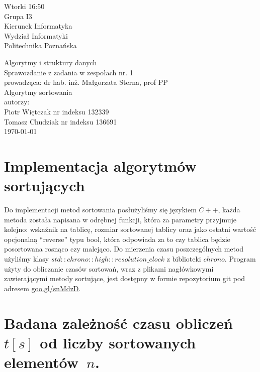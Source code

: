 \documentclass[polish,polish,a4paper]{article}
\begin{document}
	
\begin{spacing}{1.5}
		\begin{titlepage}
			\begin{flushright}
				{ Wtorki 16:50\\
					Grupa I3\\
					Kierunek Informatyka\\
					Wydział Informatyki\\
					Politechnika Poznańska}
			\end{flushright}
		\vspace*{\fill}
		\begin{center}
			{\Large Algorytmy i struktury danych \\[0.1cm]
				Sprawozdanie z zadania w zespołach nr. 1\\[0.1cm]
				prowadząca: dr hab. inż. Małgorzata Sterna, prof PP}\\
			{\Huge Algorytmy sortowania\\ [0.4cm]}
			{\large autorzy:\\[0.1cm]}
			{\large Piotr Więtczak nr indeksu 132339\\[0.1cm] Tomasz Chudziak nr indeksu 136691}\\[0.5cm]
			\today
		\end{center}
		\vspace*{\fill}
	\end{titlepage}
	
	\section{Implementacja algorytmów sortujących}
	Do implementacji metod sortowania posłużyliśmy się językiem $ C++ $, każda metoda została napisana  w odrębnej  funkcji, która za parametry przyjmuje kolejno: wskaźnik na tablicę, rozmiar sortowanej tablicy oraz jako ostatni wartość opcjonalną “reverse” typu bool, która odpowiada za to czy tablica będzie posortowana rosnąco czy malejąco. Do mierzenia czasu poszczególnych metod użyliśmy klasy $ std::chrono::high::resolution\_clock  $ z biblioteki $ chrono $. Program użyty do obliczanie czasów sortowań, wraz z plikami nagłówkowymi zawierającymi metody sortujące, jest dostępny w formie repozytorium git pod adresem \hyperref{goo.gl/snMdzD}{}{}{goo.gl/snMdzD}.
	\section{Badana zależność czasu obliczeń $ t[s]$ od liczby sortowanych elementów~$ n $. }
	

\end{spacing}
\end{document}
